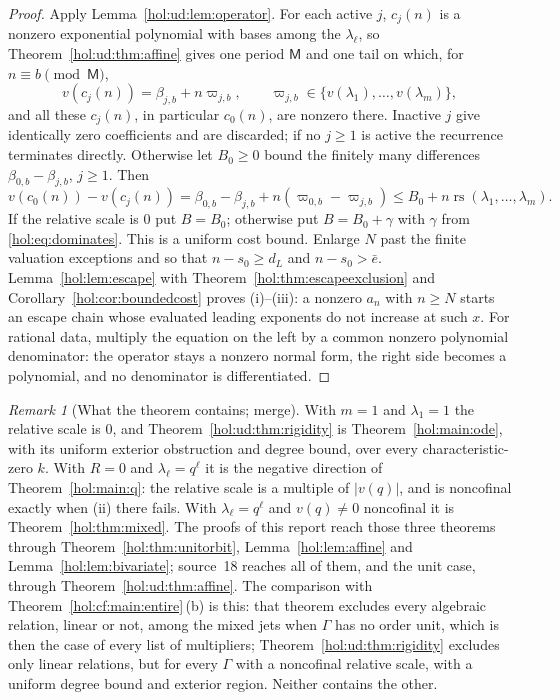 \documentclass[11pt]{article}
\numberwithin{equation}{section}
\theoremstyle{definition}
\theoremstyle{remark}
\newtheorem{remark}[theorem]{Remark}
\newcommand{\abs}[1]{\lvert#1\rvert}
\begin{document}
\begin{proof}
Apply Lemma~\ref{hol:ud:lem:operator}. For each active $j$, $c_j(n)$ is a
nonzero exponential polynomial with bases among the $\lambda_\ell$, so
Theorem~\ref{hol:ud:thm:affine} gives one period $\mathsf M$ and one tail on
which, for $n\equiv b\pmod{\mathsf M}$,
\begin{equation}\label{hol:ud:eq:cjvaluations}
 v(c_j(n))=\beta_{j,b}+n\varpi_{j,b},\qquad
 \varpi_{j,b}\in\{v(\lambda_1),\ldots,v(\lambda_m)\},
\end{equation}
and all these $c_j(n)$, in particular $c_0(n)$, are nonzero there. Inactive
$j$ give identically zero coefficients and are discarded; if no $j\ge1$ is
active the recurrence terminates directly. Otherwise let $B_0\ge0$ bound the
finitely many differences $\beta_{0,b}-\beta_{j,b}$, $j\ge1$. Then
\[
 v(c_0(n))-v(c_j(n))=\beta_{0,b}-\beta_{j,b}+n(\varpi_{0,b}-\varpi_{j,b})
 \le B_0+n\operatorname{rs}(\lambda_1,\ldots,\lambda_m).
\]
If the relative scale is $0$ put $B=B_0$; otherwise put $B=B_0+\gamma$ with
$\gamma$ from \eqref{hol:eq:dominates}. This is a uniform cost bound. Enlarge
$N$ past the finite valuation exceptions and so that $n-s_0\ge d_L$ and
$n-s_0>\bar e$. Lemma~\ref{hol:lem:escape} with
Theorem~\ref{hol:thm:escapeexclusion} and Corollary~\ref{hol:cor:boundedcost}
proves (i)--(iii): a nonzero $a_n$ with $n\ge N$ starts an escape chain whose
evaluated leading exponents do not increase at such $x$. For rational data,
multiply the equation on the left by a common nonzero polynomial denominator:
the operator stays a nonzero normal form, the right side becomes a
polynomial, and no denominator is differentiated.
\end{proof}

\begin{remark}[What the theorem contains; merge]\label{hol:ud:rem:contains}
With $m=1$ and $\lambda_1=1$ the relative scale is $0$, and
Theorem~\ref{hol:ud:thm:rigidity} is Theorem~\ref{hol:main:ode}, with its
uniform exterior obstruction and degree bound, over every
characteristic-zero $k$. With $R=0$ and $\lambda_\ell=q^\ell$ it is the
negative direction of Theorem~\ref{hol:main:q}: the relative scale is a
multiple of $\abs{v(q)}$, and is noncofinal exactly when (ii) there fails. With
$\lambda_\ell=q^\ell$ and $v(q)\ne0$ noncofinal it is
Theorem~\ref{hol:thm:mixed}. The proofs of this report reach those three
theorems through Theorem~\ref{hol:thm:unitorbit},
Lemma~\ref{hol:lem:affine} and Lemma~\ref{hol:lem:bivariate}; source~18 reaches
all of them, and the unit case, through Theorem~\ref{hol:ud:thm:affine}. The
comparison with Theorem~\ref{hol:cf:main:entire}\,(b) is this: that theorem
excludes every algebraic relation, linear or not, among the mixed jets when
$\Gamma$ has no order unit, which is then the case of every list of
multipliers; Theorem~\ref{hol:ud:thm:rigidity} excludes only linear relations,
but for every $\Gamma$ with a noncofinal relative scale, with a uniform degree
bound and exterior region. Neither contains the other.
\end{remark}
\end{document}
